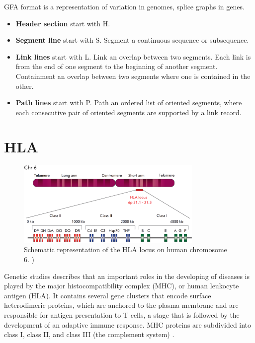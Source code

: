 

GFA format is a representation of variation in genomes, splice graphs in genes.





\begin{itemize}

\item\textbf{Header section} start with H.
\item\textbf{Segment line} start with S.
Segment a continuous sequence or subsequence.
\item\textbf{Link lines} start with L.
Link an overlap between two segments. Each link is from the end of one segment to the beginning of another segment. Containment an overlap between two segments where one is contained in the other.
\item\textbf{Path lines} start with P. 
Path an ordered list of oriented segments, where each consecutive pair of oriented segments are supported by a link record.



\end{itemize}

\section{HLA}

\begin{figure}[H]
\centering
\includegraphics[width=0.80\textwidth]{fig/HLA_loci.png}
\decoRule
\caption{Schematic representation of the HLA locus on human chromosome 6. \cite{zakharova2019contribution})}
\label{fig:HLA.png}
\end{figure}



Genetic studies describes that an important roles in the developing of diseases is played by the major histocompatibility complex (MHC), or human leukocyte antigen (HLA). It contains several gene clusters that encode surface heterodimeric proteins, which are anchored to the plasma membrane and are responsible for antigen presentation to T cells, a stage that is followed by the development of an adaptive immune response. MHC proteins are subdivided into class I, class II, and class III (the complement system) \cite{campbell1993map}.



